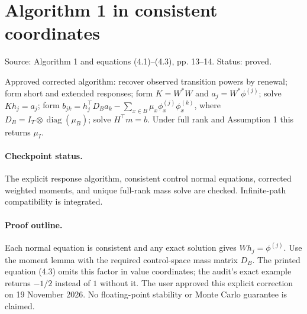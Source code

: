\section{Algorithm 1 in consistent coordinates}
Source: Algorithm 1 and equations (4.1)–(4.3), pp. 13–14. Status: proved.
\begin{theorem}\label{algorithm}

Approved corrected algorithm: recover observed transition powers by renewal; form short and extended responses; form $K=W^*W$ and $a_j=W^*\phi^{(j)}$; solve $Kh_j=a_j$; form $b_{jk}=h_j^\top D_Ba_k-\sum_{x\in B}\mu_x\phi_x^{(j)}\phi_x^{(k)}$, where $D_B=I_T\otimes\operatorname{diag}(\mu_B)$; solve $H^\top m=b$. Under full rank and Assumption 1 this returns $\mu_I$.


\paragraph{Checkpoint status.}
The explicit response algorithm, consistent control normal equations, corrected weighted moments, and unique full-rank mass solve are checked. Infinite-path compatibility is integrated.
\end{theorem}
\paragraph{Proof outline.}

Each normal equation is consistent and any exact solution gives $Wh_j=\phi^{(j)}$. Use the moment lemma with the required control-space mass matrix $D_B$. The printed equation (4.3) omits this factor in value coordinates; the audit's exact example returns $-1/2$ instead of $1$ without it. The user approved this explicit correction on 19 November 2026. No floating-point stability or Monte Carlo guarantee is claimed.
